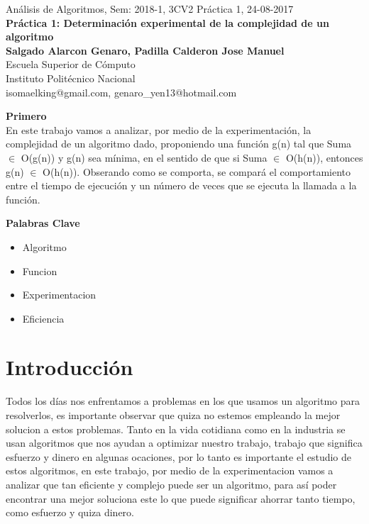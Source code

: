 \documentclass[spanish]{article}
\begin{document}
	\setmarginsrb{30mm}{30mm}{30mm}{30mm}{0pt}{0mm}{0pt}{0mm}
	
	\begin{center}
	{\Large Análisis de Algoritmos, Sem: 2018-1, 3CV2 Práctica 1, 24-08-2017}\\
{\huge {\bf Práctica 1: Determinación experimental de
la complejidad de un algoritmo}} \\
{\large {\bf Salgado Alarcon Genaro, Padilla Calderon Jose Manuel}\\
Escuela Superior de Cómputo \\
Instituto Politécnico Nacional}\\
isomaelking@gmail.com, genaro\_yen13@hotmail.com\\	
	\end{center}
	\bigskip
	
	\bigskip
	
	\bigskip
	
	{\LARGE {\bf Primero}}\\
En este trabajo vamos a analizar, por medio de  la
 experimentación, la complejidad de un  algoritmo dado,  proponiendo  una 
función g(n) tal que Suma $\in$ O(g(n)) y g(n) sea mínima, en el sentido 
de que si Suma $\in$ O(h(n)), entonces g(n) $\in$ O(h(n)). 
Obserando como se comporta, se compará el  comportamiento entre 
el tiempo de ejecución y un número de veces que se ejecuta la llamada a la función.
\bigskip


	{\Large {\bf Palabras Clave}}\\
	\begin{itemize}
		\item Algoritmo
		\item Funcion
		\item Experimentacion
		\item Eficiencia
	\end{itemize}
	\bigskip
	
	\section{Introducci\'on}
	Todos los días nos enfrentamos a problemas en los que usamos un algoritmo para resolverlos, es importante observar que quiza no estemos empleando la mejor solucion a estos problemas. 
	Tanto en la vida cotidiana como en la industria se usan algoritmos que nos ayudan a optimizar nuestro trabajo, trabajo que significa esfuerzo y dinero en algunas ocaciones, por lo tanto
	es importante el estudio de estos algoritmos, en este trabajo, por medio de la experimentacion vamos a analizar que tan eficiente y complejo puede ser un algoritmo, para así poder encontrar una mejor soluciona este
	lo que puede significar ahorrar tanto tiempo, como esfuerzo y quiza dinero.
	\bigskip
\newpage
\end{document}
